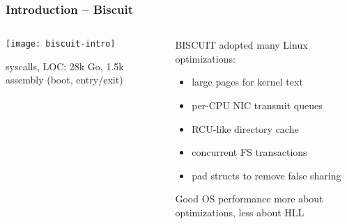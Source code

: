 \begin{frame}[plain]
	\frametitle{Introduction -- Biscuit}
	
	\begin{columns}
		
		\begin{column}{.4\textwidth}
			
			\texttt{[image: biscuit-intro]}
			
			 syscalls, LOC: 28k Go,
			1.5k assembly (boot, entry/exit)
			
		\end{column}
		
		\begin{column}{.6\textwidth}
			BISCUIT adopted many Linux optimizations:
			
			\begin{itemize}
				\item large pages for kernel text
				\item per-CPU NIC transmit queues
				\item RCU-like directory cache
				\item concurrent FS transactions
				\item pad structs to remove false sharing
				
			\end{itemize}
		Good OS performance more about optimizations, less about HLL
		
		\end{column}
	\end{columns}	
\end{frame}




